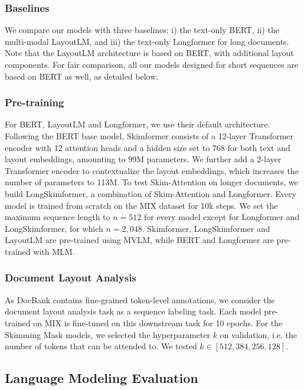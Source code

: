 \subsubsection{Baselines}

We compare our models with three baselines: i) the text-only \ac{BERT}, ii) the multi-modal LayoutLM, and iii) the text-only Longformer for long documents. Note that the LayoutLM architecture is based on \ac{BERT}, with additional layout components. For fair comparison, all our models designed for short sequences are based on \ac{BERT} as well, as detailed below.

\subsubsection{Pre-training}

For \ac{BERT}, LayoutLM and Longformer, we use their default architecture. Following the \ac{BERT} base model, Skimformer consists of a 12-layer Transformer encoder with 12 attention heads and a hidden size set to 768 for both text and layout embeddings, amounting to 99M parameters. We further add a 2-layer Transformer encoder to contextualize the layout embeddings, which increases the number of parameters to 113M. To test Skim-Attention on longer documents, we build LongSkimformer, a combination of Skim-Attention and Longformer. Every model is trained from scratch on the MIX dataset for 10k steps. We set the maximum sequence length to $n = 512$ for every model except for Longformer and LongSkimformer, for which $n = 2,048$. Skimformer, LongSkimformer and LayoutLM are pre-trained using MVLM, while \ac{BERT} and Longformer are pre-trained with MLM.

\subsubsection{Document Layout Analysis}

As DocBank contains fine-grained token-level annotations, we consider the document layout analysis task as a sequence labeling task. Each model pre-trained on MIX is fine-tuned on this downstream task for 10 epochs. For the Skimming Mask models, we selected the hyperparameter $k$ on validation, i.e. the number of tokens that can be attended to. We tested $k \in [512, 384, 256, 128]$.

\subsection{Language Modeling Evaluation}

